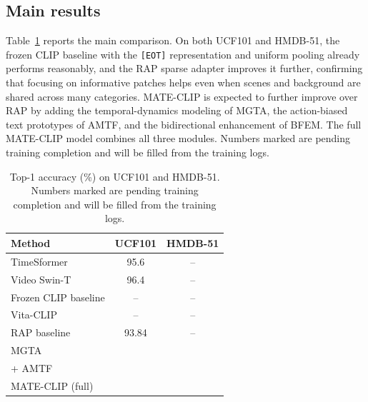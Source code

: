 \subsection{Main results}
\label{sec:main-results}
Table~\ref{tab:main} reports the main comparison.
On both UCF101 and HMDB-51, the frozen CLIP baseline with the \texttt{[EOT]} representation and uniform pooling already performs reasonably, and the RAP sparse adapter improves it further, confirming that focusing on informative patches helps even when scenes and background are shared across many categories.
MATE-CLIP is expected to further improve over RAP by adding the temporal-dynamics modeling of MGTA, the action-biased text prototypes of AMTF, and the bidirectional enhancement of BFEM.
The full MATE-CLIP model combines all three modules. Numbers marked \TODO{} are pending training completion and will be filled from the training logs.

\begin{table}[t]
  \centering
  \begin{tabular}{lcc}
    \hline
    Method & UCF101 & HMDB-51 \\
    \hline
    TimeSformer~\cite{bertasius2021timesformer} & 95.6 & -- \\
    Video Swin-T~\cite{liu2022video_swin} & 96.4 & -- \\
    Frozen CLIP baseline & -- & -- \\
    Vita-CLIP~\cite{wasim2023vitaclip} & -- & -- \\
    RAP baseline~\cite{cao2024rap} & 93.84 & -- \\
    MGTA & \TODO{} & \TODO{} \\
    + AMTF & \TODO{} & \TODO{} \\
    MATE-CLIP (full) & \TODO{} & \TODO{} \\
    \hline
  \end{tabular}
  \caption{Top-1 accuracy (\%) on UCF101 and HMDB-51. Numbers marked \TODO{} are pending training completion and will be filled from the training logs.}
  \label{tab:main}
\end{table}

